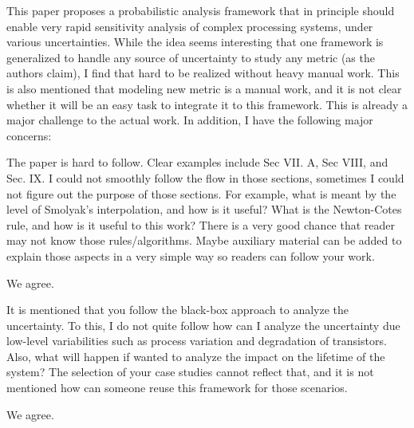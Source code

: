 \begin{reviewer}
This paper proposes a probabilistic analysis framework that in principle should
enable very rapid sensitivity analysis of complex processing systems, under
various uncertainties. While the idea seems interesting that one framework is
generalized to handle any source of uncertainty to study any metric (as the
authors claim), I find that hard to be realized without heavy manual work. This
is also mentioned that modeling new metric is a manual work, and it is not clear
whether it will be an easy task to integrate it to this framework. This is
already a major challenge to the actual work. In addition, I have the following
major concerns:

The paper is hard to follow. Clear examples include Sec VII. A, Sec VIII, and
Sec. IX. I could not smoothly follow the flow in those sections, sometimes I
could not figure out the purpose of those sections. For example, what is meant
by the level of Smolyak's interpolation, and how is it useful? What is the
Newton-Cotes rule, and how is it useful to this work? There is a very good
chance that reader may not know those rules/algorithms. Maybe auxiliary material
can be added to explain those aspects in a very simple way so readers can follow
your work.
\end{reviewer}

\begin{authors}
We agree.

\begin{actions}
\end{actions}
\end{authors}

\begin{reviewer}
It is mentioned that you follow the black-box approach to analyze the
uncertainty. To this, I do not quite follow how can I analyze the uncertainty
due low-level variabilities such as process variation and degradation of
transistors. Also, what will happen if wanted to analyze the impact on the
lifetime of the system? The selection of your case studies cannot reflect that,
and it is not mentioned how can someone reuse this framework for those
scenarios.
\end{reviewer}

\begin{authors}
We agree.

\begin{actions}
\end{actions}
\end{authors}

